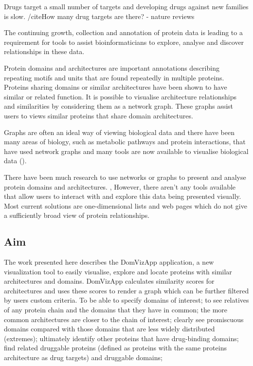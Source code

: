 Drugs target a small number of targets and developing drugs against new families is slow. /cite{How many drug targets are there? - nature reviews}


The continuing growth, collection and annotation of protein data is leading to a requirement for tools to assist bioinformaticians to explore, analyse and discover relationships in these data. 

Protein domains and architectures are important annotations describing repeating motifs and units that are found repeatedly in multiple proteins. Proteins sharing domains or similar architectures have been shown to have similar or related function. It is possible to visualise architecture relationships and similarities by considering them as a network graph. These graphs assist users to views similar proteins that share domain architectures.

Graphs are often an ideal way of viewing biological data and there have been many areas of biology, such as metabolic pathways\cite{pathway_app} and protein interactions\cite{proteinint_app}, that have used network graphs and many tools are now available to visualise biological data (\cite{cytoscape}).

There have been much research to use networks or graphs to present and analyse protein domains and architectures. \cite{treeoflife}, \cite{proviz} However, there aren't any tools available that allow users to interact with and explore this data being presented visually. Most current solutions are one-dimensional lists and web pages which do not give a sufficiently broad view of protein relationships.

\subsection{Aim} The work presented here describes the DomVizApp application, a new visualization tool to easily visualise, explore and locate proteins with similar architectures and domains. DomVizApp calculates similarity scores for architectures and uses these scores to render a graph which can be further filtered by users custom criteria. To be able to specify domains of interest; to see relatives of any protein chain and the domains that they have in common; the more common architectures are closer to the chain of interest; clearly see promiscuous domains compared with those domains that are less widely distributed (extremes); ultimately identify other proteins that have drug-binding domains; find related druggable proteins (defined as proteins with the same proteins architecture as drug targets) and druggable domains; 

